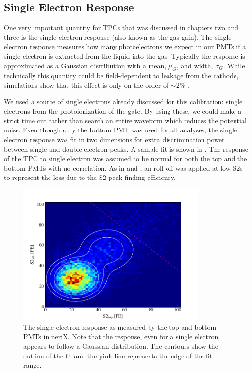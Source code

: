 \subsection{Single Electron Response}
\label{sec:nerix_gas_gain}

One very important quantity for TPCs that was discussed in chapters two and three is the single electron response (also known as the gas gain).  The single electron response measures how many photoelectrons we expect in our PMTs if a single electron is extracted from the liquid into the gas.  Typically the response is approximated as a Gaussian distribution with a mean, $\mu_G$, and width, $\sigma_G$.  While technically this quantity could be field-dependent to leakage from the cathode, simulations show that this effect is only on the order of $\sim2\%$ \cite{goetzke2015low}.

We used a source of single electrons already discussed for this calibration: single electrons from the photoionization of the gate.  By using these, we could make a strict time cut rather than search an entire waveform which reduces the potential noise.  Even though only the bottom PMT was used for all analyses, the single electron response was fit in two dimensions for extra discrimination power between single and double electron peaks.  A sample fit is shown in .  The response of the TPC to single electron was assumed to be normal for both the top and the bottom PMTs with no correlation.  As in  and , an roll-off was applied at low S2s to represent the loss due to the S2 peak finding efficiency.

\begin{figure}[t]
        \centering
	\includegraphics[width=0.85\textwidth]{nerix_gas_gain}
	\caption{The single electron response as measured by the top and bottom PMTs in neriX.  Note that the response, even for a single electron, appears to follow a Gaussian distribution.  The contours show the outline of the fit and the pink line represents the edge of the fit range.}
	\label{fig:nerix_gas_gain}
\end{figure}

